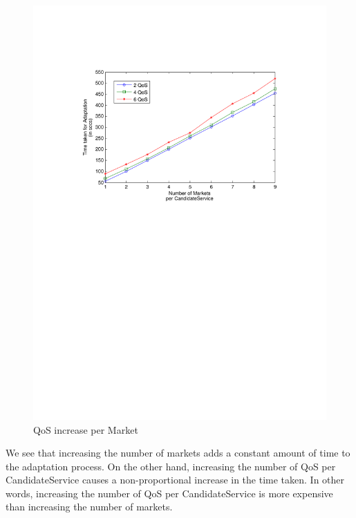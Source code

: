 \documentclass[10pt,journal,compsoc]{IEEEtran}
\begin{document}
\begin{figure}[htbp]
\begin{minipage}{0.4\linewidth}
			\includegraphics[clip, trim=2cm 16cm 6cm 4cm, scale=0.4]{graphs/2_4_6_qos_per_mkt_scaling.pdf}
			\caption{QoS increase per Market \label{fig:qos_per_mkt}}
		\end{minipage}		
\end{figure}

We see that increasing the number of markets adds a constant amount of time to the adaptation process. On the other hand, increasing the number of QoS per CandidateService causes a non-proportional increase in the time taken. In other words, increasing the number of QoS per CandidateService is more expensive than increasing the number of markets. 
\end{document}
